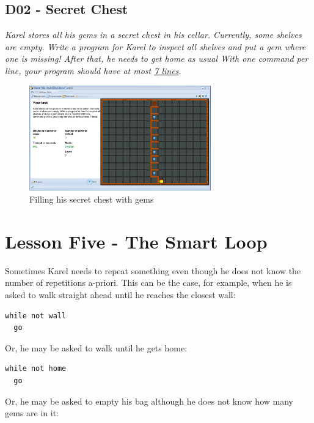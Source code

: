 \documentclass[article,A4,12pt]{llncs}
\begin{document}
\subsection{D02 - Secret Chest}

{\em Karel stores all his gems in a secret chest in his cellar. 
Currently, some shelves are empty. Write a program for Karel to 
inspect all shelves and put a gem where one is missing! After that, he needs to get 
home as usual With one 
command per line, your program should have at most \underline{7 lines}.}

\begin{figure}[!ht]
\begin{center}
\includegraphics[width=0.7\textwidth]{img/d02.png}
\end{center}
\vspace{-4mm}
\caption{Filling his secret chest with gems}
\label{fig:d02}
\vspace{-4mm}
\end{figure}
\noindent



\section{Lesson Five - The Smart Loop}

Sometimes Karel needs to repeat something even though he does not know 
the number of repetitions a-priori. This can be the case, for example, 
when he is asked to walk straight ahead until he reaches the closest wall:

\begin{verbatim}
while not wall
  go
\end{verbatim}
Or, he may be asked to walk until he gets home:

\begin{verbatim}
while not home
  go
\end{verbatim}
Or, he may be asked to empty his bag although he does not know how 
many gems are in it: 
 
\end{document}
